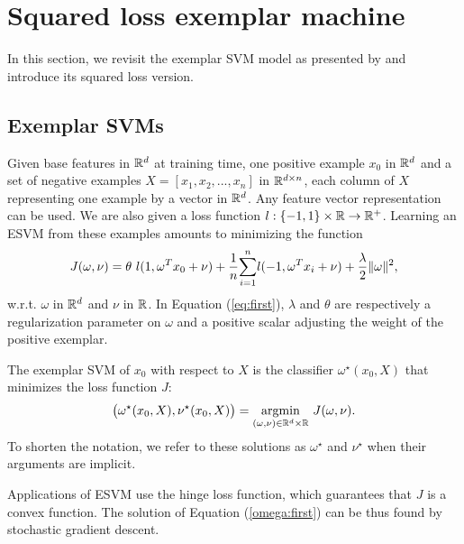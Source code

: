 \section{Squared loss exemplar machine}\label{lsesvm}

In this section, we revisit the exemplar SVM model as presented by \cite{Efros11} and introduce its squared loss version.
\subsection{Exemplar SVMs} \label{esvm}
Given base features in $\mathbb R^d$ at training time, one positive example $x_0$ in $\mathbb R^d$ and a set of negative examples $X = [x_1, x_2,...,x_n]$ in $\mathbb R^{d\times n}$, each column of $X$ representing one example by a vector in $\mathbb R^d$. 
Any feature vector representation can be used.
We are also given a loss function $l:\{-1, 1\}\times \mathbb R\rightarrow\mathbb R^+$. Learning an ESVM from these examples amounts to minimizing the function 
\begin{equation}
J(\omega, \nu) = \theta \ l(1, \omega^Tx_0+\nu) +\dfrac{1}{n}\displaystyle{\sum_{i=1}^n} l(-1, \omega^T x_i+\nu)+\dfrac{\lambda}{2}\|\omega\|^2, \label{eq:first}
\end{equation}
w.r.t. $\omega$ in $\mathbb R^d$ and $\nu$ in $\mathbb R$. In Equation (\ref{eq:first}), $\lambda$ and $\theta$ are respectively a regularization parameter on $\omega$ and a positive scalar adjusting the weight of the positive exemplar.

The  exemplar SVM of $x_0$ with respect to $X$ is the classifier $\omega^\star(x_0,X)$ that minimizes the loss function $J$:
\begin{equation}
\big(\omega^\star(x_0, X), \nu^\star(x_0, X)\big) = \underset{(\omega,\nu)\in\mathbb R^d\times\mathbb R}{\operatorname*{argmin}} \ J(\omega, \nu). \label{omega:first}
\end{equation}
To shorten the notation, we refer to these solutions as $\omega^\star$ and $\nu^\star$ when their arguments are implicit.

Applications of ESVM use the hinge loss function, which guarantees that $J$ is a convex function. The solution of Equation (\ref{omega:first}) can be thus found by stochastic gradient descent.


